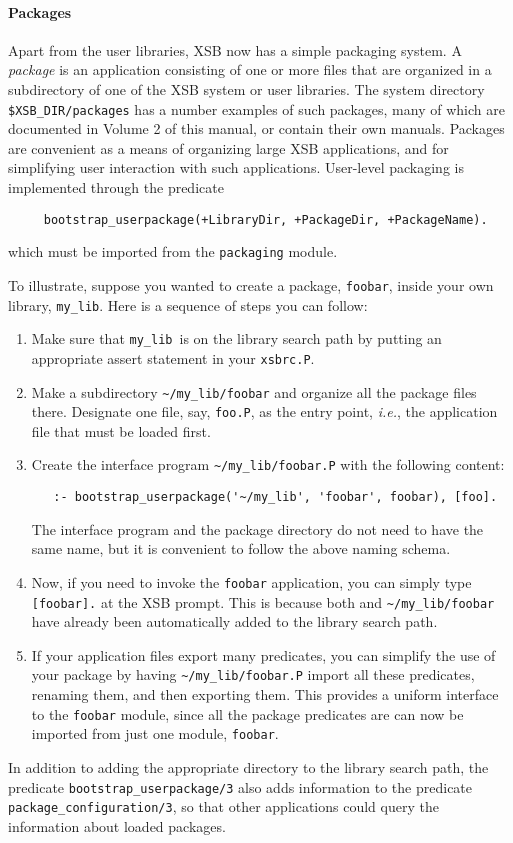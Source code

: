 \paragraph{Packages}
Apart from the user libraries, XSB now has a simple packaging system.
A {\em package\/} is an application consisting of one or more files that
are organized in a subdirectory of one of the XSB system or user libraries.
The system directory \verb|$XSB_DIR/packages| has a number examples
of such packages, many of which are documented in Volume 2 of this
manual, or contain their own manuals.  Packages are convenient
as a means of organizing large XSB applications, and for simplifying
user interaction with such applications.  User-level packaging is
implemented through the predicate
\begin{verbatim}
     bootstrap_userpackage(+LibraryDir, +PackageDir, +PackageName).
\end{verbatim}
which must be imported from the {\tt packaging} module. 

To illustrate, suppose you wanted to create a package, {\tt foobar}, inside
your own library, {\tt my\_lib}. Here is a sequence of steps you can
follow:  
\begin{enumerate}
\item Make sure that {\tt my\_lib}\ is on the library search path by putting
  an appropriate assert statement in your {\tt xsbrc.P}.
\item Make a subdirectory \verb|~/my_lib/foobar| and organize all the
  package files there. Designate one file, say, {\tt foo.P}, as the
  entry point, {\it i.e.}, the application file that must be loaded first.
\item Create the interface program \verb|~/my_lib/foobar.P| with the
  following content:
    \begin{verbatim}
   :- bootstrap_userpackage('~/my_lib', 'foobar', foobar), [foo].
    \end{verbatim}
  The interface program and the package directory do not need to have the
  same name, but it is convenient to follow the above naming schema.
\item Now, if you need to invoke the {\tt foobar} application, you can
  simply type \verb|[foobar].| at the XSB prompt. This is because both and
  \verb|~/my_lib/foobar| have already been automatically added to the
  library search path.
\item If your application files export many predicates, you can simplify
  the use of your package by having \verb|~/my_lib/foobar.P| import all
  these predicates, renaming them, and then exporting them. This provides a
  uniform interface to the {\tt foobar} module, since all the package
  predicates are can now be imported from just one module, {\tt foobar}.
\end{enumerate}
In addition to adding the appropriate directory to the library search
path, the predicate \verb|bootstrap_userpackage/3| also adds
information to the predicate \verb|package_configuration/3|, so that
other applications could query the information about loaded packages.

